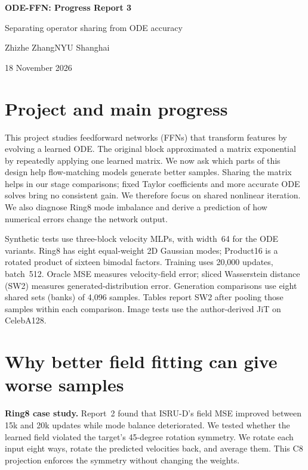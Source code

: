 \documentclass[11pt]{article}
\begin{document}
\begin{center}
{\LARGE\bfseries ODE-FFN: Progress Report 3}\par
\vspace{4pt}
{\large Separating operator sharing from ODE accuracy}\par
\vspace{6pt}
Zhizhe Zhang\quad\textbar\quad NYU Shanghai\par
18 November 2026
\end{center}
\vspace{3pt}

\section{Project and main progress}
This project studies feedforward networks (FFNs) that transform features by
evolving a learned ODE. The original block approximated a matrix exponential
by repeatedly applying one learned matrix. We now ask which parts of this
design help flow-matching models generate better samples. Sharing the matrix
helps in our stage comparisons; fixed Taylor coefficients and more accurate
ODE solves bring no consistent gain. We therefore focus on shared nonlinear
iteration. We also diagnose Ring8 mode imbalance and derive a prediction of
how numerical errors change the network output.

Synthetic tests use three-block velocity MLPs, with width~64 for the ODE
variants. Ring8 has eight equal-weight 2D Gaussian modes; Product16 is a rotated
product of sixteen bimodal factors. Training uses 20,000 updates, batch~512.
Oracle MSE measures velocity-field error; sliced Wasserstein distance (SW2)
measures generated-distribution error. Generation comparisons use eight shared
sets (banks) of 4,096 samples. Tables report SW2 after pooling those samples
within each comparison. Image tests use the author-derived JiT on CelebA128.

\section{Why better field fitting can give worse samples}
\textbf{Ring8 case study.} Report~2 found that ISRU-D's field MSE improved
between 15k and 20k updates while mode balance deteriorated. We tested whether
the learned field violated the target's 45-degree rotation symmetry. We rotate
each input eight ways, rotate the predicted velocities back, and average them.
This C8 projection enforces the symmetry without changing the weights.
\end{document}

